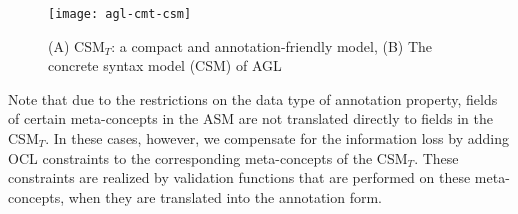 \begin{figure*}[ht]
	\begin{center}
		\texttt{[image: agl-cmt-csm]}
	\end{center}
	\caption{(A) CSM$_T$: a compact and annotation-friendly model, (B) The concrete syntax model (CSM) of AGL} %
	\label{fig:agl-csm}
\end{figure*}

Note that due to the restrictions on the data type of annotation property, fields of certain meta-concepts in the ASM are not translated directly to fields in the CSM$_T$. In these cases, however, we compensate for the information loss by adding OCL constraints to the corresponding meta-concepts of the CSM$_T$. These constraints are realized by validation functions that are performed on these meta-concepts, when they are translated into the annotation form.
%
